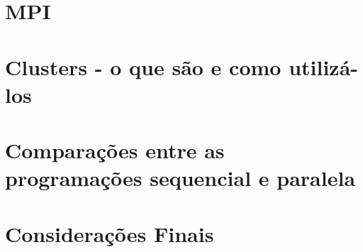     \chapter{MPI}
    
    \chapter{Clusters - o que são e como utilizá-los}
    
    \chapter{Comparações entre as programações sequencial e paralela}
    
    \chapter{Considerações Finais}
    
	
	
	

